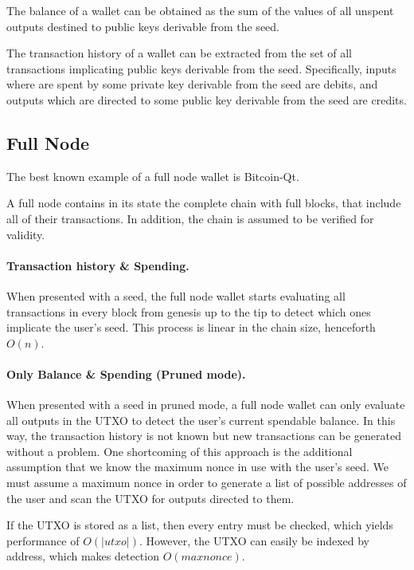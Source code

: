 \documentclass[sigconf]{acmart}
\begin{document}
The balance of a wallet can be obtained as the sum of the values of all unspent outputs destined to public keys derivable from the seed.

The transaction history of a wallet can be extracted from the set of all transactions implicating public keys derivable from the seed. Specifically, inputs where are spent by some private key derivable from the seed are debits, and outputs which are directed to some public key derivable from the seed are credits.

\subsection{Full Node}
The best known example of a full node wallet is Bitcoin-Qt.

A full node contains in its state the complete chain with full blocks, that include all of their transactions. In addition, the chain is assumed to be verified for validity.

\paragraph{Transaction history \& Spending.}
When presented with a seed, the full node wallet starts evaluating all transactions in every block from genesis up to the tip to detect which ones implicate the user's seed. This process is linear in the chain size, henceforth $O(n)$.

\paragraph{Only Balance \& Spending (Pruned mode).}
When presented with a seed in pruned mode, a full node wallet can only evaluate all outputs in the UTXO to detect the user's current spendable balance. In this way, the transaction history is not known but new transactions can be generated without a problem. One shortcoming of this approach is the additional assumption that we know the maximum nonce in use with the user's seed. We must assume a maximum nonce in order to generate a list of possible addresses of the user and scan the UTXO for outputs directed to them.

If the UTXO is stored as a list, then every entry must be checked, which yields performance of $O(|utxo|)$. However, the UTXO can easily be indexed by address, which makes detection $O(maxnonce)$.
\end{document}
